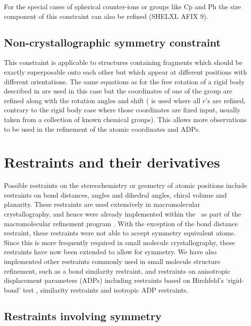 \documentclass[11pt]{article}
\begin{document}
For the special cases of spherical counter-ions or groups like Cp and Ph the size component of this constraint can also be refined (SHELXL AFIX 9).

\subsection{Non-crystallographic symmetry constraint}
This constraint is applicable to structures containing fragments which should be exactly superposable onto each other but which appear at different positions with different orientations.
The same equations as for the free rotation of a rigid body described in  are used in this case but the coordinates of one of the group are refined along with the rotation angles and shift (  is used where all $r$'s are refined, contrary to the rigid body case where those coordinates are fixed input, usually taken from a collection of known chemical groups). This allows more observations to be used in the refinement of the atomic coordinates and ADPs.


\section{Restraints and their derivatives}
\label{appendix:restraints}
Possible restraints on the stereochemistry or geometry of atomic positions include restraints on bond distances, angles and dihedral angles, chiral volume and planarity. These restraints are used extensively in macromolecular crystallography, and hence were already implemented within the \cctbx\ as part of the macromolecular refinement program \phenixrefine. With the exception of the bond distance restraint, these restraints were not able to accept symmetry equivalent atoms. Since this is more frequently required in small molecule crystallography, these restraints have now been extended to allow for symmetry. We have also implemented other restraints commonly used in small molecule structure refinement, such as a bond similarity restraint, and restraints on anisotropic displacement parameters (ADPs) including restraints based on Hirshfeld's `rigid-bond' test \cite{Hirshfeld:1976aa}, similarity restraints and isotropic ADP restraints.

\subsection{Restraints involving symmetry}
\end{document}
